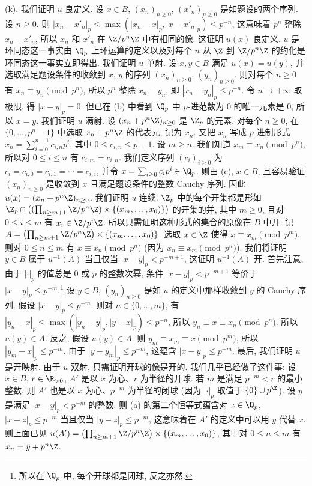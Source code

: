 \begin{solution}
(k). 我们证明 $u$ 良定义. 设 $x \in B$, $(x_n)_{n \geq 0}$, $(x'_n)_{n \geq 0}$ 是如题设的两个序列. 设 $n \geq 0$. 则 $|x_n - x'_n|_p \leq \max(|x_n - x|_p, |x - x'_n|_p) \leq p^{-n}$, 这意味着 $p^n$ 整除 $x_n - x'_n$, 所以 $x_n$ 和 $x'_n$ 在 $\Z/p^n\Z$ 中有相同的像. 这证明 $u(x)$ 良定义.
$u$ 是环同态这一事实由 $\Q_p$ 上环运算的定义以及对每个 $n$ 从 $\Z$ 到 $\Z/p^n\Z$ 的约化是环同态这一事实立即得出.
我们证明 $u$ 单射. 设 $x, y \in B$ 满足 $u(x) = u(y)$, 并选取满足题设条件的收敛到 $x$, $y$ 的序列 $(x_n)_{n \geq 0}$, $(y_n)_{n \geq 0}$. 则对每个 $n \geq 0$ 有 $x_n \equiv y_n \pmod{p^n}$, 所以 $p^n$ 整除 $x_n - y_n$, 即 $|x_n - y_n|_p \leq p^{-n}$. 令 $n \to +\infty$ 取极限, 得 $|x - y|_p = 0$. 但已在 (b) 中看到 $\Q_p$ 中 $p$-进范数为 $0$ 的唯一元素是 $0$, 所以 $x = y$.
我们证明 $u$ 满射. 设 $(x_n + p^n\Z)_{n \geq 0}$ 是 $\Z_p$ 的元素. 对每个 $n \geq 0$, 在 $\{0, \ldots, p^n - 1\}$ 中选取 $x_n + p^n\Z$ 的代表元, 记为 $x_n$. 又把 $x_n$ 写成 $p$ 进制形式 $x_n = \sum_{i=0}^{n-1}c_{i,n}p^i$, 其中 $0 \leq c_{i,n} \leq p - 1$. 设 $m \geq n$. 我们知道 $x_m \equiv x_n \pmod{p^n}$, 所以对 $0 \leq i \leq n$ 有 $c_{i,m} = c_{i,n}$. 我们定义序列 $(c_i)_{i \geq 0}$ 为 $c_i = c_{i,0} = c_{i,1} = \cdots = c_{i,i}$, 并令 $x = \sum_{i \geq 0}c_ip^i \in \Q_p$. 则由 (c), $x \in B$, 且容易验证 $(x_n)_{n \geq 0}$ 是收敛到 $x$ 且满足题设条件的整数 Cauchy 序列. 因此 $u(x) = (x_n + p^n\Z)_{n \geq 0}$.
我们证明 $u$ 连续. $\Z_p$ 中的每个开集都是形如 $\Z_p \cap \bigl((\prod_{n \geq m+1}\Z/p^n\Z) \times \{(x_m, \ldots, x_0)\}\bigr)$ 的开集的并, 其中 $m \geq 0$, 且对 $0 \leq i \leq m$ 有 $x_i \in \Z/p^i\Z$. 所以只需证明这种形式的集合的原像在 $B$ 中开. 记 $A = \bigl(\prod_{n \geq m+1}\Z/p^n\Z\bigr) \times \{(x_m, \ldots, x_0)\}$. 选取 $x \in \Z$ 使得 $x \equiv x_m \pmod{p^m}$. 则对 $0 \leq n \leq m$ 有 $x \equiv x_n \pmod{p^n}$ (因为 $x_n \equiv x_m \pmod{p^n}$). 我们将证明 $y \in B$ 属于 $u^{-1}(A)$ 当且仅当 $|x - y|_p < p^{-m+1}$, 这证明 $u^{-1}(A)$ 开. 首先注意, 由于 $|\cdot|_p$ 的值总是 $0$ 或 $p$ 的整数次幂, 条件 $|x - y|_p < p^{-m+1}$ 等价于 $|x - y|_p \leq p^{-m}$.\footnote{所以在 $\Q_p$ 中, 每个开球都是闭球, 反之亦然.} 设 $y \in B$, $(y_n)_{n \geq 0}$ 是如 $u$ 的定义中那样收敛到 $y$ 的 Cauchy 序列. 假设 $|x - y|_p \leq p^{-m}$. 则对 $n \in \{0, \ldots, m\}$, 有 $|y_n - x|_p \leq \max(|y_n - y|_p, |y - x|_p) \leq p^{-n}$, 所以 $y_n \equiv x \equiv x_n \pmod{p^n}$. 所以 $u(y) \in A$. 反之, 假设 $u(y) \in A$. 则 $y_m \equiv x_m \equiv x \pmod{p^m}$, 所以 $|y_m - x|_p \leq p^{-m}$. 由于 $|y - y_m|_p \leq p^{-m}$, 这蕴含 $|x - y|_p \leq p^{-m}$.
最后, 我们证明 $u$ 是开映射. 由于 $u$ 双射, 只需证明开球的像是开的. 我们几乎已经做了这件事: 设 $x \in B$, $r \in \R_{>0}$, $A'$ 是以 $x$ 为心、$r$ 为半径的开球. 若 $m$ 是满足 $p^{-m} < r$ 的最小整数, 则 $A'$ 也是以 $x$ 为心、$p^{-m}$ 为半径的闭球 (因为 $|\cdot|_p$ 取值于 $\{0\} \cup p^{\Z}$). 设 $y$ 是满足 $|x - y|_p < p^{-m}$ 的整数. 则 (a) 的第二个恒等式蕴含对 $z \in \Q_p$, $|x - z|_p \leq p^{-m}$ 当且仅当 $|y - z|_p \leq p^{-m}$, 这意味着在 $A'$ 的定义中可以用 $y$ 代替 $x$. 则上面已见 $u(A') = \bigl(\prod_{n \geq m+1}\Z/p^n\Z\bigr) \times \{(x_m, \ldots, x_0)\}$, 其中对 $0 \leq n \leq m$ 有 $x_n = y + p^n\Z$.


\end{solution}
